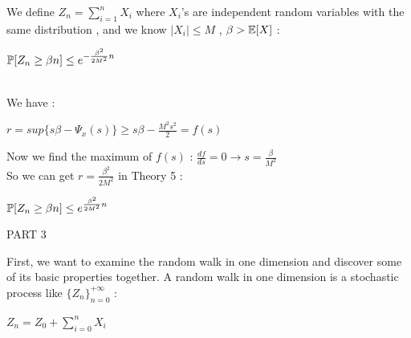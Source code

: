 \documentclass[30pt]{article}
\begin{document}
{\color{blue}{\large 3.} We define $Z_n = \sum_{i=1}^{n}{X_i}$ where $X_i$'s are independent random variables with the same distribution , and we know $ |X_i| \le M $ , $ \beta > \Bbb{E}[X] $ :\\
\begin{center}
    $\Bbb{P}[Z_n \ge \beta n] \le e^{-\frac{\beta ^ 2}{2M^2}n} $
\end{center}
} \\
We have : \\
\begin{center}
    $r = sup\{ s\beta - \Psi_x(s) \} \ge s\beta - \frac{M^2s^2}{2} = f(s)$
\end{center} 
Now we find the maximum of $f(s)$ : \hspace{0.3cm} $\frac{df}{ds} = 0 \rightarrow s = \frac{\beta}{M^2}$ \\
So we can get $r = \frac{\beta^2}{2M^2} $ in {\color{blue}Theory 5} : \\
\begin{center}
    $\Bbb{P}[Z_n \ge \beta n] \le e^{\frac{\beta^2}{2M^2}n} $
\end{center}

\newpage 
{\huge \color{blue} PART 3} \\ \newline
{\large \color{blue} First, we want to examine the random walk in one dimension and discover some of its basic properties together. A random walk in one dimension is a stochastic process like $\{Z_n\}_{n = 0}^{+\infty} $ : \\ 
\begin{center}
    $Z_n = Z_0 + \sum_{i = 0}^{n}X_i$
\end{center}
} \\ \newline 
\end{document}
